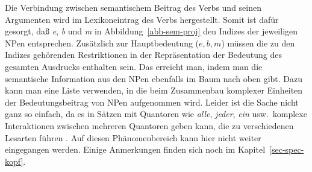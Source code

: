 \noindent
Die Verbindung zwischen semantischem Beitrag des Verbs und seinen Argumenten wird im Lexikoneintrag
des Verbs hergestellt. Somit ist dafür gesorgt, daß \emph{e}, \emph{b} und \emph{m} in 
Abbildung~\ref{abb-sem-proj} den Indizes der jeweiligen NPen entsprechen. Zusätzlich zur Hauptbedeutung
($e,b,m$) müssen die zu den Indizes gehörenden Restriktionen in der Repräsentation der Bedeutung
des gesamten Ausdrucks enthalten sein. Das erreicht man, indem man die semantische Information aus den
NPen ebenfalls im Baum nach oben gibt. Dazu kann man \zb eine Liste verwenden, in die beim Zusammenbau
komplexer Einheiten der Bedeutungsbeitrag von NPen aufgenommen wird. Leider ist die Sache nicht ganz so einfach,
da es in Sätzen mit Quantoren wie \emph{alle}, \emph{jeder}, \emph{ein} usw.\ komplexe Interaktionen
zwischen mehreren Quantoren geben kann, die zu verschiedenen Lesarten führen \citep{Frey93a,Kiss2001a}.
Auf diesen Phänomenbereich kann hier nicht weiter eingegangen werden.
Einige Anmerkungen finden sich noch im Kapitel~\ref{sec-spec-kopf}.%



